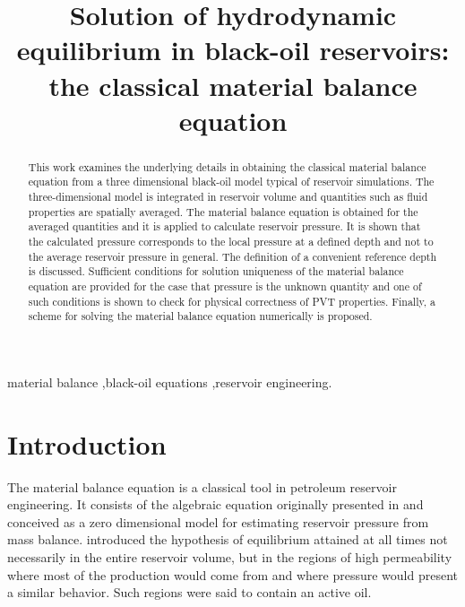 \documentclass[authoryear,preprint,review,11pt]{elsarticle}
\begin{document}
\begin{frontmatter}
\title{Solution of hydrodynamic equilibrium in black-oil reservoirs: the classical material balance equation}

%



\begin{abstract}
This work examines the underlying details in obtaining the classical material balance equation from a three dimensional black-oil model typical of reservoir simulations. The three-dimensional model is integrated in reservoir volume and quantities such as fluid properties are spatially averaged. The material balance equation is obtained for the averaged quantities and it is applied to calculate reservoir pressure. It is shown that the calculated pressure corresponds to the local pressure at a defined depth and not to the average reservoir pressure in general. The definition of a convenient reference depth is discussed. Sufficient conditions for solution uniqueness of the material balance equation are provided for the case that pressure is the unknown quantity and one of such conditions is shown to check for physical correctness of PVT properties.
Finally, a scheme for solving the material balance equation numerically is proposed.
\end{abstract}

\begin{keyword}
material balance \sep black-oil equations \sep reservoir engineering.
\end{keyword}
\end{frontmatter}

\section{Introduction}
The material balance equation is a classical tool in petroleum reservoir engineering. It consists of the algebraic equation originally presented in \cite{schilthuis1936active} and conceived as a zero dimensional model for estimating reservoir pressure from mass balance. \cite{schilthuis1936active} introduced the hypothesis of equilibrium attained at all times not necessarily in the entire reservoir volume, but in the regions of high permeability where most of the production would come from and where pressure would present a similar behavior. Such regions were said to contain an active oil.
\end{document}
